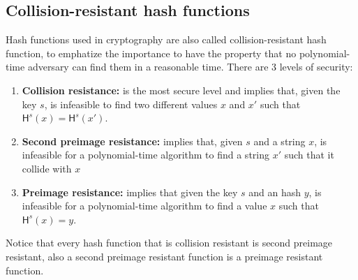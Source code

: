 \subsection{Collision-resistant hash functions}
Hash functions used in cryptography are also called collision-resistant hash function, to emphatize the importance to have the property that no polynomial-time adversary can find them in a reasonable time.
There are 3 levels of security:
\begin{enumerate}
    \item{\textbf{Collision resistance:} is the most secure level and implies that, given the key $s$, is infeasible to find two different values $x$ and $x'$ such that $\mathsf{H}^s(x) = \mathsf{H}^s(x')$.}
    \item{\textbf{Second preimage resistance:} implies that, given $s$ and a string $x$, is infeasible for a polynomial-time algorithm to find a string $x'$ such that it collide with $x$}
    \item{\textbf{Preimage resistance:} implies that given the key $s$ and an hash $y$, is infeasible for a polynomial-time algorithm to find a value $x$ such that $\mathsf{H}^s(x) = y$.}
\end{enumerate}
Notice that every hash function that is collision resistant is second preimage resistant, also a second preimage resistant function is a preimage resistant function.\\

